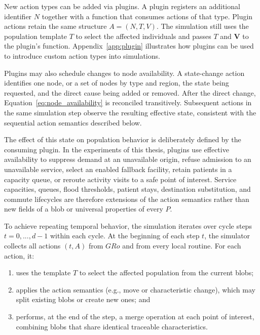 \documentclass[pdflatex,sn-mathphys-num]{sn-jnl}%
\theoremstyle{thmstyleone}%
\theoremstyle{thmstyletwo}%
\theoremstyle{thmstylethree}%
\begin{document}
New action types can be added via plugins. A plugin registers an additional identifier $N$ together with a function that consumes actions of that type. Plugin actions retain the same structure $A=(N,T,V)$. The simulation still uses the population template $T$ to select the affected individuals and passes $T$ and $\bm{V}$ to the plugin’s function. Appendix~\ref{app:plugin} illustrates how plugins can be used to introduce custom action types into simulations.

\begingroup\color{red}
Plugins may also schedule changes to node availability. A state-change action identifies one node, or a set of nodes by type and region, the state being requested, and the direct cause being added or removed. After the direct change, Equation~\ref{eq:node_availability} is reconciled transitively. Subsequent actions in the same simulation step observe the resulting effective state, consistent with the sequential action semantics described below.

The effect of this state on population behavior is deliberately defined by the consuming plugin. In the experiments of this thesis, plugins use effective availability to suppress demand at an unavailable origin, refuse admission to an unavailable service, select an enabled fallback facility, retain patients in a capacity queue, or reroute activity visits to a safe point of interest. Service capacities, queues, flood thresholds, patient stays, destination substitution, and commute lifecycles are therefore extensions of the action semantics rather than new fields of a blob or universal properties of every $P$.
\endgroup


To achieve repeating temporal behavior, the simulation iterates over cycle steps $t = 0, ..., d-1$ within each cycle. At the beginning of each step 
$t$, the simulator collects all actions $(t,A)$ from $GRo$ and from every local routine. For each action, it:
\begin{enumerate}
    \item uses the template $T$ to select the affected population from the current blobs;
    \item applies the action semantics (e.g., move or characteristic change), which may split existing blobs or create new ones; and
    \item performs, at the end of the step, a merge operation at each point of interest, combining blobs that share identical traceable characteristics.
\end{enumerate}
\end{document}
